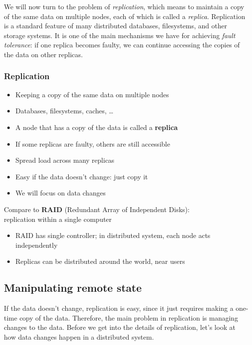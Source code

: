 We will now turn to the problem of \emph{replication}, which means to maintain a copy of the same data on multiple nodes, each of which is called a \emph{replica}.
Replication is a standard feature of many distributed databases, filesystems, and other storage systems.
It is one of the main mechanisms we have for achieving \emph{fault tolerance}: if one replica becomes faulty, we can continue accessing the copies of the data on other replicas.

\begin{frame}
    \label{s:replication-intro}
    \frametitle{Replication}
    \begin{itemize}
        \item Keeping a copy of the same data on multiple nodes
        \item Databases, filesystems, caches, \dots
        \item A node that has a copy of the data is called a \textbf{replica}\pause
        \item If some replicas are faulty, others are still accessible
        \item Spread load across many replicas\pause
        \item Easy if the data doesn't change: just copy it
        \item We will focus on data changes\\[1em]\pause
    \end{itemize}
    Compare to \textbf{RAID} (Redundant Array of Independent Disks):\\replication within a single computer
    \begin{itemize}
        \item RAID has single controller; in distributed system, each node acts independently
        \item Replicas can be distributed around the world, near users
    \end{itemize}
\end{frame}
\label{l:replication-intro}

\subsection{Manipulating remote state}\label{sec:remote-state}

If the data doesn't change, replication is easy, since it just requires making a one-time copy of the data.
Therefore, the main problem in replication is managing changes to the data.
Before we get into the details of replication, let's look at how data changes happen in a distributed system.

